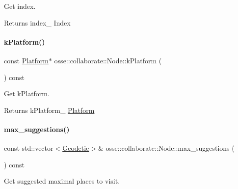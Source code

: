 Get index. 

\begin{DoxyReturn}{Returns}
index\+\_\+ Index 
\end{DoxyReturn}
\mbox{\label{classosse_1_1collaborate_1_1_node_a9601f81216155623ab7fe14d26f78f88}} 
\paragraph{\texorpdfstring{k\+Platform()}{kPlatform()}}
{\footnotesize\ttfamily const \hyperlink{classosse_1_1collaborate_1_1_platform}{Platform}$\ast$ osse\+::collaborate\+::\+Node\+::k\+Platform (\begin{DoxyParamCaption}{ }\end{DoxyParamCaption}) const\hspace{0.3cm}{\ttfamily [inline]}}



Get k\+Platform. 

\begin{DoxyReturn}{Returns}
k\+Platform\+\_\+ \hyperlink{classosse_1_1collaborate_1_1_platform}{Platform} 
\end{DoxyReturn}
\mbox{\label{classosse_1_1collaborate_1_1_node_a883dae4381225516446aa574b9c9a12b}} 
\paragraph{\texorpdfstring{max\+\_\+suggestions()}{max\_suggestions()}}
{\footnotesize\ttfamily const std\+::vector$<$\hyperlink{classosse_1_1collaborate_1_1_geodetic}{Geodetic}$>$\& osse\+::collaborate\+::\+Node\+::max\+\_\+suggestions (\begin{DoxyParamCaption}{ }\end{DoxyParamCaption}) const\hspace{0.3cm}{\ttfamily [inline]}}



Get suggested maximal places to visit. 

